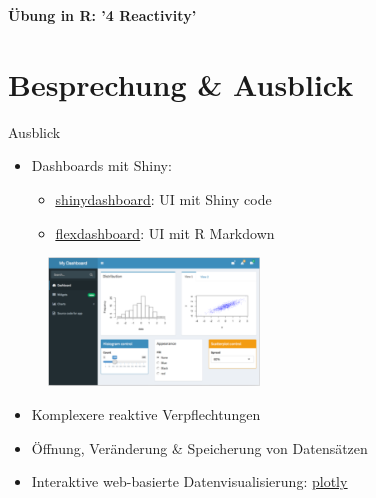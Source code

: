 \documentclass[xcolor=dvipsnames]{beamer}\usepackage[]{graphicx}\usepackage[]{color}
\begin{document}
\begin{frame}{}
  \centering
  \textbf{Übung in R: '4 Reactivity'}
\end{frame}



\section{Besprechung \& Ausblick} %


\begin{frame}{Ausblick} 
  \begin{itemize}
    \item Dashboards mit Shiny:
    \begin{itemize}
      \item \href{http://rstudio.github.io/shinydashboard/get_started.html}{\underline{shinydashboard}}: UI mit Shiny code
       \item \href{https://rmarkdown.rstudio.com/flexdashboard/}{\underline{flexdashboard}}: UI mit R Markdown
     \end{itemize}
  \end{itemize}
  
  \begin{figure}
    	\centering
    	\includegraphics[width=0.5\textwidth]{figure/shinydashboard-example.png}
    \end{figure}  
    
  \begin{itemize}
    \item Komplexere reaktive Verpflechtungen
    \item Öffnung, Veränderung \& Speicherung von Datensätzen
    \item Interaktive web-basierte Datenvisualisierung: \href{https://plotly-r.com/}{\underline{plotly}}
  \end{itemize}
\end{frame}
\end{document}
